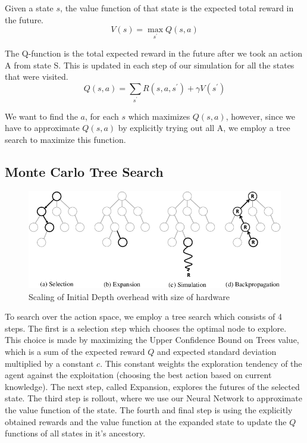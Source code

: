 \documentclass[%
 reprint,
 amsmath,amssymb,
 aps,
]{revtex4-2}
\begin{document}
Given a state $s$, the value function of that state is the expected total reward in the future.
\begin{equation}
    V(s) = \max_{s^\prime} Q(s, a)
\end{equation}

The Q-function is the total expected reward in the future after we took an action A from state S. This is updated in each step of our simulation for all the states that were visited.
\begin{equation}
    Q(s, a) = \sum_{s^\prime} R(s, a, s^\prime) + \gamma V(s^\prime)
\end{equation}

We want to find the $a$, for each $s$ which maximizes $Q(s, a)$, however, since we have to approximate $Q(s, a)$ by explicitly trying out all A, we employ a tree search to maximize this function.

\subsection{\label{sec:method-mcts}Monte Carlo Tree Search}

\begin{figure}[H]
    \includegraphics[width=\linewidth]{images/mcts-explainer.jpg}
    \caption{\label{fig:mcts-explainer}
        Scaling of Initial Depth overhead with size of hardware}
\end{figure}

To search over the action space, we employ a tree search which consists of 4 steps. The first is a selection step which chooses the optimal node to explore. This choice is made by maximizing the Upper Confidence Bound on Trees value, which is a sum of the expected reward $Q$ and expected standard deviation multiplied by a constant $c$. This constant weights the exploration tendency of the agent against the exploitation (choosing the best action based on current knowledge). The next step, called Expansion, explores the futures of the selected state. The third step is rollout, where we use our Neural Network to approximate the value function of the state. The fourth and final step is using the explicitly obtained rewards and the value function at the expanded state to update the $Q$ functions of all states in it's ancestory.
\end{document}

